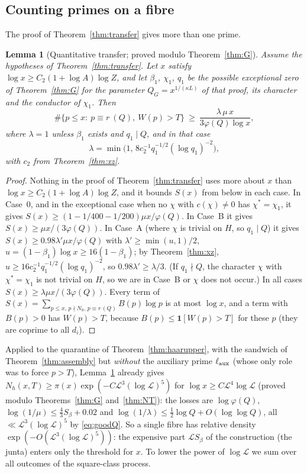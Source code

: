 \documentclass[11pt,reqno]{amsart}
\newtheorem{lemma}[theorem]{Lemma}
\theoremstyle{definition}
\newcommand{\Lc}{\mathcal L}
\begin{document}
\subsection*{Counting primes on a fibre}
The proof of Theorem~\ref{thm:transfer} gives more than one prime.

\begin{lemma}[Quantitative transfer; proved modulo Theorem~\ref{thm:G}]\label{lem:qtransfer}
Assume the hypotheses of Theorem~\ref{thm:transfer}.  Let $x$ satisfy
$\log x\ge C_2(1+\log A)\log Z$, and let $\beta_1$, $\chi_1$, $q_1$ be the possible
exceptional zero of Theorem~\ref{thm:G} for the parameter $Q_G=x^{1/(\kappa L)}$ of
that proof, its character and the conductor of $\chi_1$.  Then
\[
 \#\{p\le x:\ p\equiv r\ (Q),\ W(p)>T\}\ \ge\ \frac{\lambda\,\mu\,x}{3\varphi(Q)\log x},
\]
where $\lambda=1$ unless $\beta_1$ exists and $q_1\mid Q$, and in that case
\[
 \lambda=\min\big(1,\,8c_2^{-1}q_1^{-1/2}(\log q_1)^{-2}\big),
\]
with $c_2$ from Theorem~\ref{thm:xz}.
\end{lemma}

\begin{proof}
Nothing in the proof of Theorem~\ref{thm:transfer} uses more about $x$ than
$\log x\ge C_2(1+\log A)\log Z$, and it bounds $S(x)$ from below in each case.
In Case~0, and in the exceptional case when no $\chi$ with $c(\chi)\ne0$ has
$\chi^*=\chi_1$, it gives $S(x)\ge(1-1/400-1/200)\mu x/\varphi(Q)$.  In Case~B it
gives $S(x)\ge\mu x/(3\varphi(Q))$.  In Case~A (where $\chi$ is trivial on $H$, so
$q_1\mid Q$) it gives $S(x)\ge0.98\lambda'\mu x/\varphi(Q)$ with
$\lambda'\ge\min(u,1)/2$, $u=(1-\beta_1)\log x\ge16(1-\beta_1)$; by
Theorem~\ref{thm:xz}, $u\ge16c_2^{-1}q_1^{-1/2}(\log q_1)^{-2}$, so
$0.98\lambda'\ge\lambda/3$.  (If $q_1\nmid Q$, the character $\chi$ with
$\chi^*=\chi_1$ is not trivial on $H$, so we are in Case~B or $\chi$ does not
occur.)  In all cases $S(x)\ge\lambda\mu x/(3\varphi(Q))$.  Every term of
$S(x)=\sum_{p\le x,\,p\nmid N_0,\,p\equiv r\,(Q)}B(p)\log p$ is at most $\log x$, and a
term with $B(p)>0$ has $W(p)>T$, because $B(p)\le\mathbf 1[W(p)>T]$ for these $p$
(they are coprime to all $d_i$).
\end{proof}

Applied to the quarantine of Theorem~\ref{thm:haarupper}, with the sandwich of
Theorem~\ref{thm:assembly} but \emph{without} the auxiliary prime $\ell_{\rm aux}$
(whose only role was to force $p>T$), Lemma~\ref{lem:qtransfer} already gives
$N_h(x,T)\ge\pi(x)\exp(-C\Lc^3(\log\Lc)^5)$ for $\log x\ge C\Lc^4\log\Lc$ (proved modulo
Theorems~\ref{thm:G} and~\ref{thm:NT}): the losses are
$\log\varphi(Q)$, $\log(1/\mu)\le\frac43S_\beta+0.02$ and
$\log(1/\lambda)\le\frac12\log Q+O(\log\log Q)$, all $\ll\Lc^3(\log\Lc)^5$ by
\eqref{eq:goodQ}.  So a single fibre has relative density
$\exp(-O(\Lc^3(\log\Lc)^5))$: the expensive part $\Lc S_\beta$ of the construction
(the junta) enters only the threshold for $x$.  To lower the power of $\log\Lc$
we sum over all outcomes of the square-class process.
\end{document}
